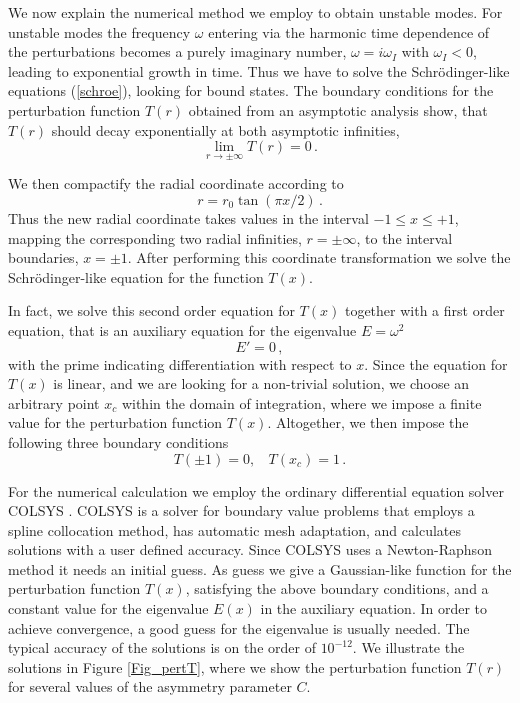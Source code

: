 \documentclass[aps,prd,12pt,superscriptaddress]{revtex4-2}
\begin{document}
We now explain the numerical method we employ to obtain unstable modes.
For unstable modes the frequency $\omega$ entering via the harmonic time dependence of the perturbations becomes a purely imaginary number, $\omega = i\omega_I$ with $\omega_I<0$, leading to exponential growth in time. 
Thus we have to solve the Schr\"odinger-like equations (\ref{schroe}), looking for bound states. 
The boundary conditions for the perturbation function $T(r)$ obtained from an asymptotic analysis show, that $T(r)$ should decay exponentially at both asymptotic infinities, 
\begin{equation}
    \underset{r\to \pm \infty}{\lim} T(r) = 0 \, .
\end{equation}

We then compactify the radial coordinate according to 
\begin{equation}
    r = r_0 \tan(\pi x/2) \, .
\end{equation}
Thus the new radial coordinate takes values in the interval $-1 \le x \le +1$,  mapping the corresponding two radial infinities, $r=\pm \infty$, to the interval boundaries, $x=\pm 1$.
After performing this coordinate transformation we solve the Schr\"odinger-like equation for the function $T(x)$.
 
In fact, we solve this second order equation for $T(x)$ together with a first order equation, that is an auxiliary equation for the eigenvalue $E=\omega^2$
\begin{equation}
    E'=0 
    \, ,
\end{equation}
with the prime indicating differentiation with respect to $x$.
Since the equation for $T(x)$ is linear, and we are looking for a non-trivial solution, we choose an arbitrary point $x_c$ within the domain of integration, where we impose a finite value for the perturbation function $T(x)$.
Altogether, we then impose the following three boundary conditions
\begin{equation}
    T(\pm1)=0 , \ \ \ \ T(x_c)=1 \, .
\end{equation}
 
For the numerical calculation we employ the ordinary differential equation solver COLSYS \cite{Ascher:1979iha}.
COLSYS is a solver for boundary value problems that employs a spline collocation method, has automatic mesh adaptation, and calculates solutions with a user defined accuracy.
Since COLSYS uses a Newton-Raphson method it needs an initial guess.
As guess we give a Gaussian-like function for the perturbation function $T(x)$, satisfying the above boundary conditions, and a constant value for the eigenvalue $E(x)$ in the auxiliary equation.
In order to achieve convergence, a good guess for the eigenvalue is usually needed.
The typical accuracy of the solutions is on the order of $10^{-12}$.
We illustrate the solutions in Figure \ref{Fig_pertT}, where we show the perturbation function $T(r)$ for several values of the asymmetry parameter $C$.
\end{document}
